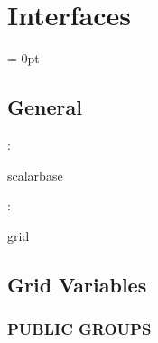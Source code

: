 
\section{Interfaces} 


\parskip = 0pt

\vspace{3mm} \subsection*{General}

: 

scalarbase
\vspace{2mm}

: 

grid
\vspace{2mm}
\subsection*{Grid Variables}
\vspace{5mm}\subsubsection{PUBLIC GROUPS}

\vspace{5mm}

